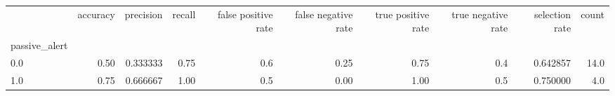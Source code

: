 \begin{tabular}{lrrrrrrrrr}
\toprule
{} &  accuracy &  precision &  recall &  false positive rate &  false negative rate &  true positive rate &  true negative rate &  selection rate &  count \\
passive\_alert &           &            &         &                      &                      &                     &                     &                 &        \\
\midrule
0.0           &      0.50 &   0.333333 &    0.75 &                  0.6 &                 0.25 &                0.75 &                 0.4 &        0.642857 &   14.0 \\
1.0           &      0.75 &   0.666667 &    1.00 &                  0.5 &                 0.00 &                1.00 &                 0.5 &        0.750000 &    4.0 \\
\bottomrule
\end{tabular}
